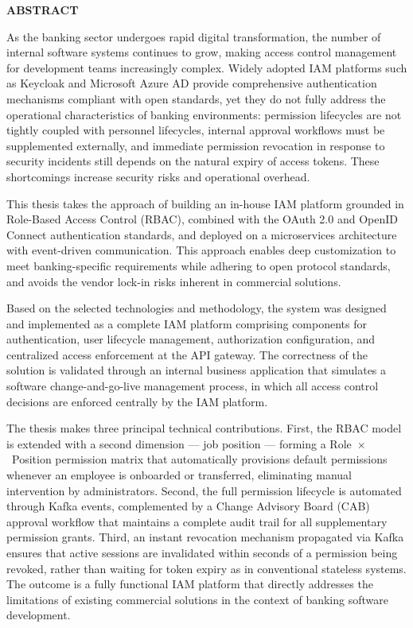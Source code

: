 \documentclass[../DoAn.tex]{subfiles}
\begin{document}
\begin{center}
    \Large{\textbf{ABSTRACT}}\\
\end{center}
\vspace{1cm}
As the banking sector undergoes rapid digital transformation, the number of internal software systems continues to grow, making access control management for development teams increasingly complex. Widely adopted IAM platforms such as Keycloak and Microsoft Azure AD provide comprehensive authentication mechanisms compliant with open standards, yet they do not fully address the operational characteristics of banking environments: permission lifecycles are not tightly coupled with personnel lifecycles, internal approval workflows must be supplemented externally, and immediate permission revocation in response to security incidents still depends on the natural expiry of access tokens. These shortcomings increase security risks and operational overhead.

This thesis takes the approach of building an in-house IAM platform grounded in Role-Based Access Control (RBAC), combined with the OAuth 2.0 and OpenID Connect authentication standards, and deployed on a microservices architecture with event-driven communication. This approach enables deep customization to meet banking-specific requirements while adhering to open protocol standards, and avoids the vendor lock-in risks inherent in commercial solutions.

Based on the selected technologies and methodology, the system was designed and implemented as a complete IAM platform comprising components for authentication, user lifecycle management, authorization configuration, and centralized access enforcement at the API gateway. The correctness of the solution is validated through an internal business application that simulates a software change-and-go-live management process, in which all access control decisions are enforced centrally by the IAM platform.

The thesis makes three principal technical contributions. First, the RBAC model is extended with a second dimension --- job position --- forming a Role~$\times$~Position permission matrix that automatically provisions default permissions whenever an employee is onboarded or transferred, eliminating manual intervention by administrators. Second, the full permission lifecycle is automated through Kafka events, complemented by a Change Advisory Board (CAB) approval workflow that maintains a complete audit trail for all supplementary permission grants. Third, an instant revocation mechanism propagated via Kafka ensures that active sessions are invalidated within seconds of a permission being revoked, rather than waiting for token expiry as in conventional stateless systems. The outcome is a fully functional IAM platform that directly addresses the limitations of existing commercial solutions in the context of banking software development.
\end{document}
